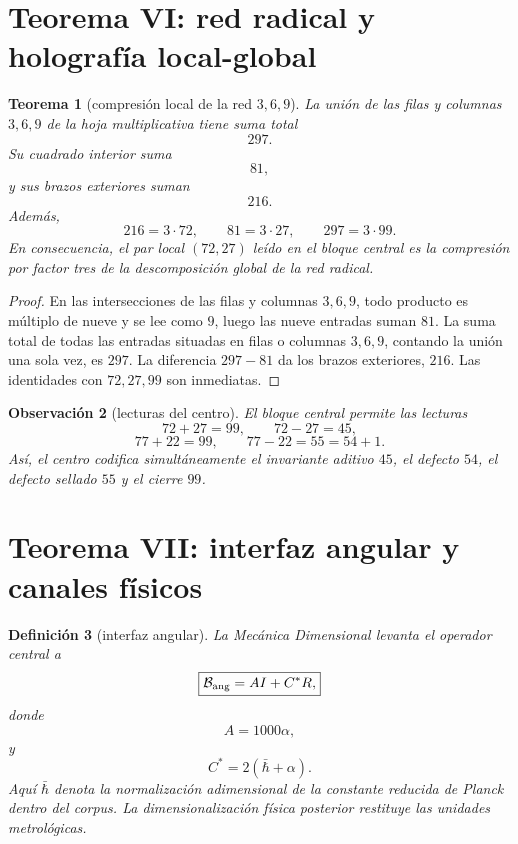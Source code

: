 \documentclass[11pt,a4paper]{article}
\newtheorem{teorema}{Teorema}
\newtheorem{definicion}[teorema]{Definici\'on}
\newtheorem{observacion}[teorema]{Observaci\'on}
\newcommand{\Bang}{\mathcal B_{\rm ang}}
\newcommand{\hbarbar}{\bar\hbar}
\begin{document}
\section{Teorema VI: red radical y holograf\'ia local-global}

\begin{teorema}[compresi\'on local de la red \(3,6,9\)]
La uni\'on de las filas y columnas \(3,6,9\) de la hoja multiplicativa tiene suma total
\[
297.
\]
Su cuadrado interior suma
\[
81,
\]
y sus brazos exteriores suman
\[
216.
\]
Adem\'as,
\[
216=3\cdot72,
\qquad
81=3\cdot27,
\qquad
297=3\cdot99.
\]
En consecuencia, el par local \((72,27)\) le\'ido en el bloque central es la compresi\'on por factor tres de la descomposici\'on global de la red radical.
\end{teorema}

\begin{proof}
En las intersecciones de las filas y columnas \(3,6,9\), todo producto es m\'ultiplo de nueve y se lee como \(9\), luego las nueve entradas suman \(81\). La suma total de todas las entradas situadas en filas o columnas \(3,6,9\), contando la uni\'on una sola vez, es \(297\). La diferencia \(297-81\) da los brazos exteriores, \(216\). Las identidades con \(72,27,99\) son inmediatas.
\end{proof}

\begin{observacion}[lecturas del centro]
El bloque central permite las lecturas
\[
72+27=99,
\qquad
72-27=45,
\]
\[
77+22=99,
\qquad
77-22=55=54+1.
\]
As\'i, el centro codifica simult\'aneamente el invariante aditivo \(45\), el defecto \(54\), el defecto sellado \(55\) y el cierre \(99\).
\end{observacion}

\section{Teorema VII: interfaz angular y canales f\'isicos}

\begin{definicion}[interfaz angular]
La Mec\'anica Dimensional levanta el operador central a
\[
\boxed{\Bang=AI+C^\ast R,}
\]
donde
\[
\boxed{A=1000\alpha,}
\]
y
\[
\boxed{C^\ast=2(\hbarbar+\alpha).}
\]
Aqu\'i \(\hbarbar\) denota la normalizaci\'on adimensional de la constante reducida de Planck dentro del corpus. La dimensionalizaci\'on f\'isica posterior restituye las unidades metrol\'ogicas.
\end{definicion}
\end{document}
